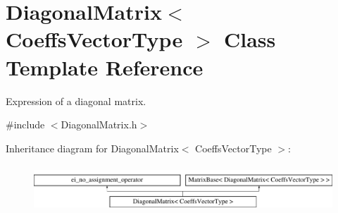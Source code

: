 \hypertarget{class_diagonal_matrix}{\section{Diagonal\-Matrix$<$ Coeffs\-Vector\-Type $>$ Class Template Reference}
\label{class_diagonal_matrix}
}


Expression of a diagonal matrix.  




{\ttfamily \#include $<$Diagonal\-Matrix.\-h$>$}

Inheritance diagram for Diagonal\-Matrix$<$ Coeffs\-Vector\-Type $>$\-:\begin{figure}[H]
\begin{center}
\leavevmode
\includegraphics[height=1.755486cm]{class_diagonal_matrix}
\end{center}
\end{figure}
